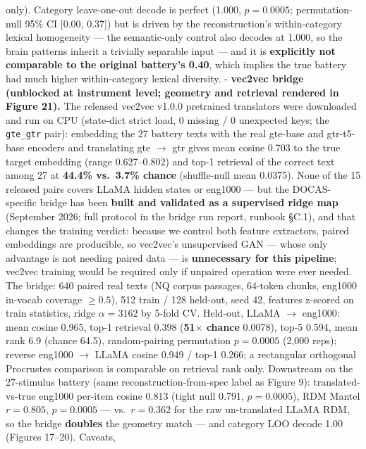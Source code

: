 \documentclass[
]{article}
\begin{document}
\begin{itemize}
  only). Category leave-one-out decode is perfect (1.000,
  \(p = 0.0005\); permutation-null 95\% CI {[}0.00, 0.37{]}) but is
  driven by the reconstruction's within-category lexical homogeneity ---
  the semantic-only control also decodes at 1.000, so the brain patterns
  inherit a trivially separable input --- and it is \textbf{explicitly
  not comparable to the original battery's 0.40}, which implies the true
  battery had much higher within-category lexical diversity. -
  \textbf{vec2vec bridge (unblocked at instrument level; geometry and
  retrieval rendered in Figure 21).} The released vec2vec v1.0.0
  pretrained translators were downloaded and run on CPU (state-dict
  strict load, 0 missing / 0 unexpected keys; the \texttt{gte\_gtr}
  pair): embedding the 27 battery texts with the real gte-base and
  gtr-t5-base encoders and translating gte \(\to\) gtr gives mean cosine
  0.703 to the true target embedding (range 0.627--0.802) and top-1
  retrieval of the correct text among 27 at \textbf{44.4\% vs.~3.7\%
  chance} (shuffle-null mean 0.0375). None of the 15 released pairs
  covers LLaMA hidden states or eng1000 --- but the DOCAS-specific
  bridge has been \textbf{built and validated as a supervised ridge map}
  (September 2026; full protocol in the bridge run report, runbook
  §C.1), and that changes the training verdict: because we control both
  feature extractors, paired embeddings are producible, so vec2vec's
  unsupervised GAN --- whose only advantage is not needing paired data
  --- is \textbf{unnecessary for this pipeline}; vec2vec training would
  be required only if unpaired operation were ever needed. The bridge:
  640 paired real texts (NQ corpus passages, 64-token chunks, eng1000
  in-vocab coverage \(\geq 0.5\)), 512 train / 128 held-out, seed 42,
  features z-scored on train statistics, ridge \(\alpha = 3162\) by
  5-fold CV. Held-out, LLaMA \(\to\) eng1000: mean cosine 0.965, top-1
  retrieval 0.398 (\textbf{51\(\times\) chance} 0.0078), top-5 0.594,
  mean rank 6.9 (chance 64.5), random-pairing permutation \(p = 0.0005\)
  (2,000 reps); reverse eng1000 \(\to\) LLaMA cosine 0.949 / top-1
  0.266; a rectangular orthogonal Procrustes comparison is comparable on
  retrieval rank only. Downstream on the 27-stimulus battery (same
  reconstruction-from-spec label as Figure 9): translated-vs-true
  eng1000 per-item cosine 0.813 (tight null 0.791, \(p = 0.0005\)), RDM
  Mantel \(r = 0.805\), \(p = 0.0005\) --- vs.~\(r = 0.362\) for the raw
  un-translated LLaMA RDM, so the bridge \textbf{doubles} the geometry
  match --- and category LOO decode 1.00 (Figures 17--20). Caveats,

\end{itemize}
\end{document}
